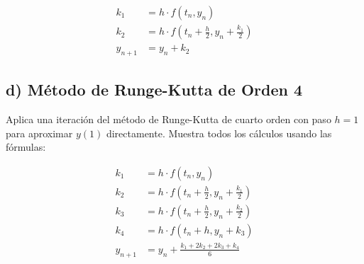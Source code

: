 \documentclass[12pt,a4paper]{article}
\begin{document}
\begin{align}
k_1 &= h \cdot f(t_n, y_n) \\
k_2 &= h \cdot f\left(t_n + \frac{h}{2}, y_n + \frac{k_1}{2}\right) \\
y_{n+1} &= y_n + k_2
\end{align}

\subsection*{d) Método de Runge-Kutta de Orden 4}
Aplica una iteración del método de Runge-Kutta de cuarto orden con paso $h = 1$ para aproximar $y(1)$ directamente. Muestra todos los cálculos usando las fórmulas:

\begin{align}
k_1 &= h \cdot f(t_n, y_n) \\
k_2 &= h \cdot f\left(t_n + \frac{h}{2}, y_n + \frac{k_1}{2}\right) \\
k_3 &= h \cdot f\left(t_n + \frac{h}{2}, y_n + \frac{k_2}{2}\right) \\
k_4 &= h \cdot f(t_n + h, y_n + k_3) \\
y_{n+1} &= y_n + \frac{k_1 + 2k_2 + 2k_3 + k_4}{6}
\end{align}
\end{document}
